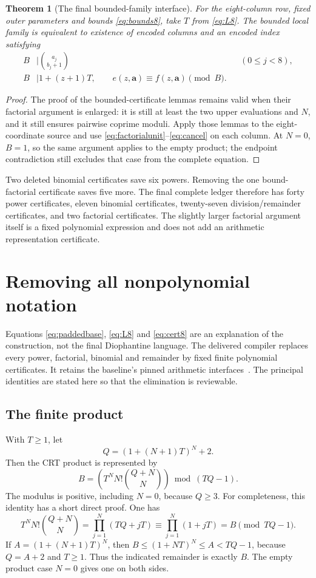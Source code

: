 \documentclass[11pt,a4paper]{article}
\newtheorem{theorem}{Theorem}[section]
\theoremstyle{definition}\newtheorem{definition}[theorem]{Definition}
\theoremstyle{remark}\newtheorem{remark}[theorem]{Remark}
\numberwithin{equation}{section}
\begin{document}
\begin{theorem}[The final bounded-family interface]\label{thm:eight}
For the eight-column row, fixed outer parameters and bounds
\eqref{eq:bounds8}, take \(T\) from \eqref{eq:L8}. The bounded local
family is equivalent to existence of encoded columns and an encoded
index satisfying
\begin{align}
 B&\mid\binom{a_j}{b_j+1} &&(0\le j<8),\nonumber\\
 B&\mid1+(z+1)T,\qquad
 e(z,\boldsymbol a)\equiv f(z,\boldsymbol a)\pmod B.
 \label{eq:cert8}
\end{align}
\end{theorem}
\begin{proof}
The proof of the bounded-certificate lemmas remains valid when their
factorial argument is enlarged: it is still at least the two upper
evaluations and \(N\), and it still ensures pairwise coprime moduli.
Apply those lemmas to the eight-coordinate source and use
\eqref{eq:factorialunit}--\eqref{eq:cancel} on each column. At \(N=0\),
\(B=1\), so the same argument applies to the empty product; the endpoint
contradiction still excludes that case from the complete equation.
\end{proof}

Two deleted binomial certificates save six powers. Removing the one
bound-factorial certificate saves five more. The final complete ledger
therefore has forty power certificates, eleven binomial certificates,
twenty-seven division/remainder certificates, and two factorial
certificates. The slightly larger factorial argument itself is a fixed
polynomial expression and does not add an arithmetic representation
certificate.

\section{Removing all nonpolynomial notation}
\label{sec:primitives}

Equations \eqref{eq:paddedbase}, \eqref{eq:L8} and \eqref{eq:cert8} are an
explanation of the construction, not the final Diophantine language.
The delivered compiler replaces every power, factorial, binomial and
remainder by fixed finite polynomial certificates. It retains the
baseline's pinned arithmetic interfaces~\cite{arith}. The principal
identities are stated here so that the elimination is reviewable.

\subsection{The finite product}
With \(T\ge1\), let
\[
 Q=(1+(N+1)T)^N+2.
\]
Then the CRT product is represented by
\begin{equation}
 B=\left(T^N N!\binom{Q+N}{N}\right)\bmod(TQ-1).
\label{eq:Bformula}
\end{equation}
The modulus is positive, including \(N=0\), because \(Q\ge3\).
For completeness, this identity has a short direct proof. One has
\[
 T^N N!\binom{Q+N}{N}
 =\prod_{j=1}^N(TQ+jT)
 \equiv\prod_{j=1}^N(1+jT)=B\pmod{TQ-1}.
\]
If \(A=(1+(N+1)T)^N\), then
\(B\le(1+NT)^N\le A<TQ-1\), because \(Q=A+2\) and \(T\ge1\).
Thus the indicated remainder is exactly \(B\). The empty product
case \(N=0\) gives one on both sides.
\end{document}
